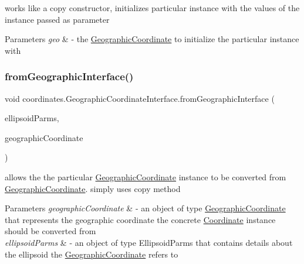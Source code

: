 works like a copy constructor, initializes particular instance with the values of the instance passed as parameter 


\begin{DoxyParams}{Parameters}
{\em geo} & -\/ the \hyperlink{classcoordinates_1_1_geographic_coordinate}{Geographic\+Coordinate} to initialize the particular instance with \\
\hline
\end{DoxyParams}
\mbox{\label{classcoordinates_1_1_geographic_coordinate_interface_a46c2f155f18261c37578c41a5f40ad1c}} 
\subsubsection{\texorpdfstring{from\+Geographic\+Interface()}{fromGeographicInterface()}}
{\footnotesize\ttfamily void coordinates.\+Geographic\+Coordinate\+Interface.\+from\+Geographic\+Interface (\begin{DoxyParamCaption}\item[{\hyperlink{classparams_1_1_ellipsoid_parms}{Ellipsoid\+Parms}}]{ellipsoid\+Parms,  }\item[{\hyperlink{classcoordinates_1_1_geographic_coordinate_interface}{Geographic\+Coordinate\+Interface}}]{geographic\+Coordinate }\end{DoxyParamCaption})}



allows the the particular \hyperlink{classcoordinates_1_1_geographic_coordinate}{Geographic\+Coordinate} instance to be converted from \hyperlink{classcoordinates_1_1_geographic_coordinate}{Geographic\+Coordinate}. simply uses copy method 


\begin{DoxyParams}{Parameters}
{\em geographic\+Coordinate} & -\/ an object of type \hyperlink{classcoordinates_1_1_geographic_coordinate}{Geographic\+Coordinate} that represents the geographic coordinate the concrete \hyperlink{classcoordinates_1_1_coordinate}{Coordinate} instance should be converted from \\
\hline
{\em ellipsoid\+Parms} & -\/ an object of type Ellipsoid\+Parms that contains details about the ellipsoid the \hyperlink{classcoordinates_1_1_geographic_coordinate}{Geographic\+Coordinate} refers to \\
\hline
\end{DoxyParams}
\mbox{\label{classcoordinates_1_1_geographic_coordinate_interface_a221ccb34f7c04980aec4af015b1c2789}} 
